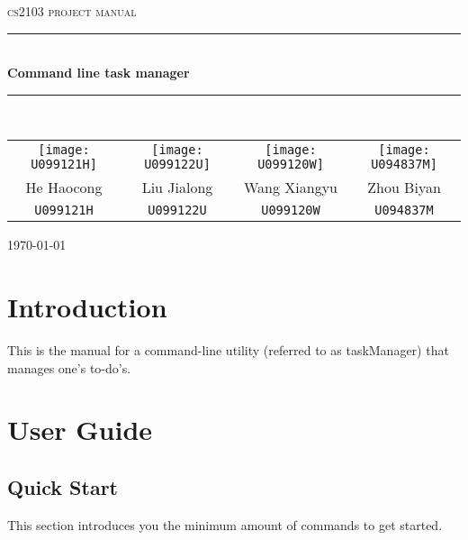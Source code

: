 \documentclass[12pt, a4paper]{article}
\begin{document}
\begin{titlepage}
  \centering

  \textsc{\LARGE cs2103 project manual}
  \\[1.5cm]
  \hrule
  \\[0.5cm]
  \Large \bfseries Command line task manager
  \\[0.4cm]
  \hrule
  \\[1.5cm]

  \begin{tabular}{c | c | c | c}
    \texttt{[image: U099121H]}&
    \texttt{[image: U099122U]}&
    \texttt{[image: U099120W]}&
    \texttt{[image: U094837M]}\\

    \small{He Haocong} & \small{Liu Jialong} & \small{Wang Xiangyu} & \small{Zhou Biyan}\\
    \small{\texttt{U099121H}} & \small{\texttt{U099122U}} & \small{\texttt{U099120W}} & \small{\texttt{U094837M}}\\
  \end{tabular}

  \vfill
  {\large \today}
\end{titlepage}

\tableofcontents
\newpage

\section{Introduction}
This is the manual for a command-line utility (referred to as taskManager) that manages one's to-do's.

\newpage
\section{User Guide}
\subsection{Quick Start}

This section introduces you the minimum amount of commands to get started.
\end{document}
